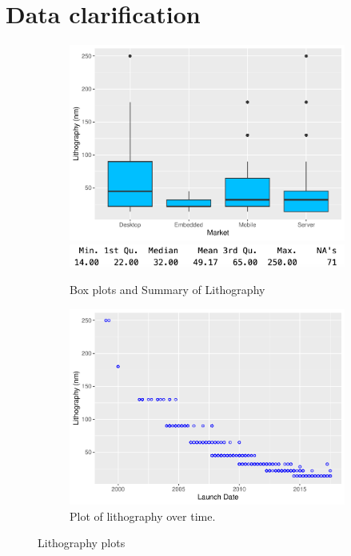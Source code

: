 %
%   
\section{Data clarification}
\label{section:data_clarify}

\begin{figure}[H]
    \centering
    \begin{subfigure}[b]{0.49\textwidth}
        \includegraphics[width=\textwidth]{./graphics/box_litho.pdf}
        \includegraphics[width=\textwidth]{./graphics/sum_litho.png}
        \caption{Box plots and Summary of Lithography}
        \label{fig:box_litho}
    \end{subfigure}
    \hfill
    \begin{subfigure}[b]{0.49\textwidth}
        \includegraphics[width=\textwidth]{./graphics/scatter_litho.pdf}
        \caption{Plot of lithography over time.}
        \label{fig:scatter_litho}
    \end{subfigure}
    \caption{Lithography plots}
\end{figure}

